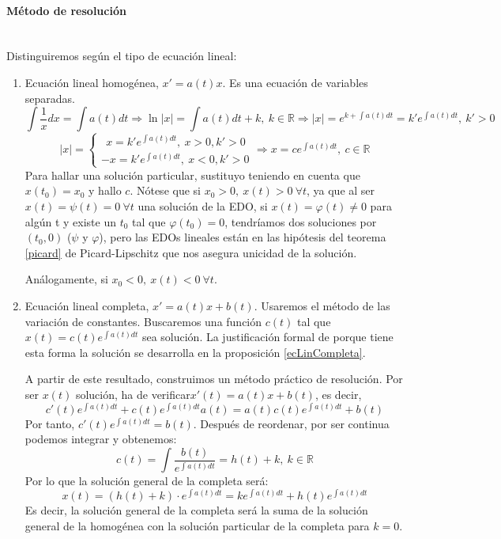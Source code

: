 \documentclass[11pt]{article}
\theoremstyle{theorem-style}  %
\theoremstyle{definition-style}
\theoremstyle{example-style}
\providecommand{\abs}[1]{\left\lvert#1\right\rvert} %
\begin{document}
\paragraph{Método de resolución} \ \\
Distinguiremos según el tipo de ecuación lineal:
\begin{enumerate}[\quad i)]
	\item Ecuación lineal homogénea, $ x'=a(t)x $. Es una ecuación de variables separadas.
	\[ \int\frac{1}{x}dx=\int a(t)dt\Rightarrow\ln\abs{x}=\int a(t)dt+k, \ k\in\mathbb{R}\Rightarrow\abs{x}=e^{k+\int a(t)dt}=k'e^{\int a(t)dt}, \ k'>0 \]
	\[ \abs{x}=\begin{cases}
	\ \ x=k'e^{\int a(t)dt}, \ x>0, k'>0\\
	-x=k'e^{\int a(t)dt}, \ x<0, k'>0
	\end{cases}\Rightarrow x=ce^{\int a(t)dt}, \ c\in \mathbb{R}  \]
	Para hallar una solución particular, sustituyo teniendo en cuenta que $ x(t_0)=x_0 $ y hallo $ c $. Nótese que si $ x_0>0,\ x(t)>0\ \forall t $, ya que al ser $ x(t)= \psi(t)=0 \ \forall t$ una solución de la EDO, si $ x(t)= \varphi(t)\neq0 $ para algún t y existe un $ t_0 $ tal que $ \varphi(t_0)=0 $, tendríamos dos soluciones por $ (t_0,0) $ ($ \psi $ y $ \varphi $), pero las EDOs lineales están en las hipótesis del teorema \ref{picard} de Picard-Lipschitz que nos asegura unicidad de la solución.
	
	Análogamente, si $ x_0<0,\ x(t)<0\ \forall t $.
	\item Ecuación lineal completa, $ x'=a(t)x +b(t) $. Usaremos el método de las variación de constantes. Buscaremos una función $ c(t) $ tal que $ x(t)=c(t)e^{\int a(t) dt} $ sea solución. La justificación formal de porque tiene esta forma la solución se desarrolla en la proposición \ref{ecLinCompleta}.
	
	A partir de este resultado, construimos un método práctico de resolución. Por ser $ x(t) $ solución, ha de verificar$ x'(t)=a(t)x+b(t) $, es decir,
	\[ c'(t)e^{\int a(t)dt}+c(t)e^{\int a(t)dt}a(t)=a(t)c(t)e^{\int a(t)dt}+b(t) \]
	Por tanto, $ c'(t)e^{\int a(t)dt}=b(t) $. Después de reordenar, por ser continua podemos integrar y obtenemos:
	\[ c(t)=\int \frac{b(t)}{e^{\int a(t)dt}}=h(t)+k, \ k\in \mathbb{R} \]
	Por lo que la solución general de la completa será:
	\[ x(t)=(h(t)+k)\cdot e^{\int a(t)dt}=ke^{\int a(t)dt}+h(t)e^{\int a(t)dt} \]
	Es decir, la solución general de la completa será la suma de la solución general de la homogénea con la solución particular de la completa para $ k=0 $.
\end{enumerate}
\end{document}
